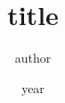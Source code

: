 \documentclass[11pt,a4paper]{article}
\title{{{ title }}}
\author{{{ author }}}
\date{{{ year }}}
\begin{document}
\maketitle

\begin{abstract}
\end{abstract}







\end{document}
